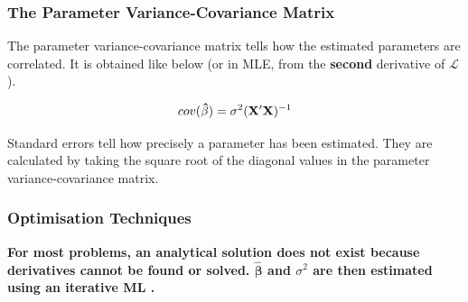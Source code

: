 \documentclass{beamer}
\newenvironment{VerbatimIN}
 {\VerbatimEnvironment
  \begin{tcolorbox}[
    breakable,
    colback=lightgray,
    spartan
  ]%
  \begin{Verbatim}}
 {\end{Verbatim}\end{tcolorbox}}
\newenvironment{VerbatimOUT}
 {\VerbatimEnvironment
  \begin{tcolorbox}[
    breakable,
    spartan
  ]%
  \begin{Verbatim}}
 {\end{Verbatim}\end{tcolorbox}}
\begin{document}
\begin{frame}
    \frametitle{The Parameter Variance-Covariance Matrix}
    The parameter variance-covariance matrix tells how the estimated parameters are correlated. It is obtained like below (or in MLE, from the \textbf{second} derivative of $\mathcal{L}$).

    \begin{equation*}
        \scriptsize{cov(\mathbf{\hat{\beta}})=\sigma^2 (\mathbf{X}' \mathbf{X})^{-1}}
    \end{equation*}
    
    \vspace{0.5cm}
    Standard errors tell how precisely a parameter has been estimated. They are calculated by taking the square root of the diagonal values in the parameter variance-covariance matrix.

\end{frame}


\begin{frame}
    \frametitle{Optimisation Techniques}
    \textbf{For most problems, an analytical solution does not exist because derivatives cannot be found or solved. $\mathbf{\hat{\beta}}$ and $\sigma^2$ are then estimated using an iterative ML \color{blue}{optimisation procedure}.}
\end{frame}
\end{document}
